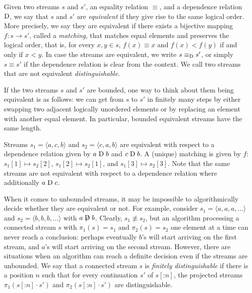 Given two streams $s$ and $s'$, an equality relation $\equiv$, and a
dependence relation $\mathrel{\mathrm{D}}$, we say that $s$ and $s'$ are
\emph{equivalent} if they give rise to the same logical order.
More precisely, we say they
are equivalent if there exists a bijective mapping $f\colon s \to s'$,
called a \emph{matching}, that matches equal elements and preserves
the logical order, that is, for every $x,y\in s$, $f(x) \equiv x$ and
$f(x)<f(y)$ if and only if $x<y$. In case the streams are equivalent,
we write $s \equiv_{\mathrel{\mathrm{D}}} s'$, or simply $s \equiv s'$ if the
dependence relation is clear from the context. We call two streams
that are not equivalent \emph{distinguishable}.

If the two streams $s$ and $s'$ are bounded, one way to think about them being
equivalent is as follows: we can get from $s$ to $s'$ in finitely many steps
by either swapping two adjacent logically unordered elements or by replacing
an element with another equal element. In particular, bounded equivalent streams
have the same length.

\begin{example}\label{diffstream:ex:equivalent-streams}
  Streams $s_1=\langle a, c, b\rangle$ and $s_2=\langle c, a, b\rangle$ are
  equivalent with respect to a dependence relation given by $a \mathrel{\mathrm{D}} b$ and
  $c \mathrel{\mathrm{D}} b$. A (unique) matching is given by $f$: $s_1[1]\mapsto s_2[2]$,
  $s_1[2] \mapsto s_2[1]$, and $s_1[3]\mapsto s_2[3]$. Note that the same streams
  are not equivalent with respect to a dependence relation where additionally
  $a \mathrel{\mathrm{D}} c$.
\end{example}

When it comes to unbounded streams, it may be impossible to algorithmically
decide whether they are equivalent or not. For example, consider $s_1=\langle
a, a, a, \ldots \rangle$ and $s_2=\langle b, b, b, \ldots \rangle$ with $a \not\mathrel{\mathrm{D}} b$. Clearly, $s_1\not\equiv s_2$, but an algorithm processing a
connected stream $s$ with $\pi_1(s)=s_1$ and $\pi_2(s)=s_2$
one element at a time
can never reach a conclusion: perhaps eventually $b$'s will start
arriving on the first stream, and $a$'s will start arriving on the second stream.
However, there are situations when an algorithm can reach a definite decision
even if the streams are unbounded. We say that a connected stream $s$ is
\emph{finitely distinguishable} if there is a position $n$ such that for every
continuation $s'$ of $s[\mathbin{:} n]$, the projected streams $\pi_1(s[\mathbin{:} n]
\cdot s')$ and $\pi_2(s[\mathbin{:} n] \cdot s')$ are distinguishable.

